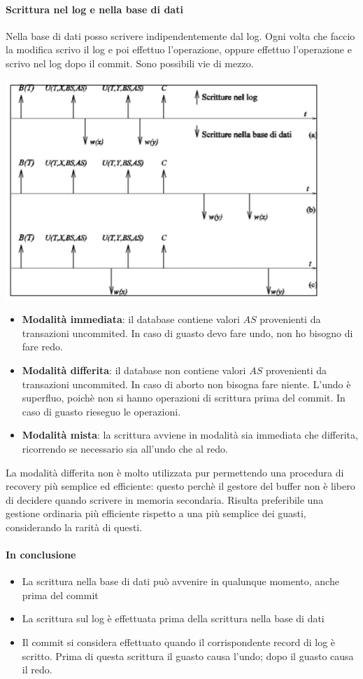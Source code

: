 \paragraph{Scrittura nel log e nella base di dati} Nella base di dati posso scrivere indipendentemente dal log. Ogni volta che faccio la modifica scrivo il log e poi effettuo l'operazione, oppure effettuo l'operazione e scrivo nel log dopo il commit. Sono possibili vie di mezzo.
\begin{center}
	\includegraphics{images/136.PNG}
\end{center}
\begin{itemize}
	\item \textbf{Modalità immediata}: il database contiene valori $AS$ provenienti da transazioni uncommited. In caso di guasto devo fare undo, non ho bisogno di fare redo.
	\item \textbf{Modalità differita}: il database non contiene valori $AS$ provenienti da transazioni uncommited. In caso di aborto non bisogna fare niente. L'undo è superfluo, poichè non si hanno operazioni di scrittura prima del commit. In caso di guasto rieseguo le operazioni.
	\item \textbf{Modalità mista}: la scrittura avviene in modalità sia immediata che differita, ricorrendo se necessario sia all'undo che al redo.
\end{itemize}
La modalità differita non è molto utilizzata pur permettendo una procedura di recovery più semplice ed efficiente: questo perchè il gestore del buffer non è libero di decidere quando scrivere in memoria secondaria. Risulta preferibile una gestione ordinaria più efficiente rispetto a una più semplice dei guasti, considerando la rarità di questi.
\paragraph{In conclusione}
\begin{itemize}
	\item La scrittura nella base di dati può avvenire in qualunque momento, anche prima del commit
	\item La scrittura sul log è effettuata prima della scrittura nella base di dati
	\item Il commit si considera effettuato quando il corrispondente record di log è scritto. Prima di questa scrittura il guasto causa l'undo; dopo il guasto causa il redo.
\end{itemize}
